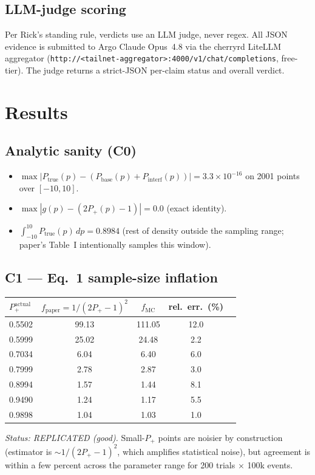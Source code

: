 \documentclass[11pt,letterpaper]{article}
\begin{document}
\subsection{LLM-judge scoring}
Per Rick's standing rule, verdicts use an LLM judge, never regex. All JSON evidence is
submitted to Argo Claude Opus~4.8 via the cherryrd LiteLLM aggregator
(\texttt{http://<tailnet-aggregator>:4000/v1/chat/completions}, free-tier). The judge returns a
strict-JSON per-claim status and overall verdict.

\section{Results}

\subsection{Analytic sanity (C0)}
\begin{itemize}
  \item $\max |P_\text{true}(p) - (P_\text{base}(p) + P_\text{interf}(p))| = 3.3 \times 10^{-16}$
    on 2001 points over $[-10, 10]$.
  \item $\max |g(p) - (2 P_+(p) - 1)| = 0.0$ (exact identity).
  \item $\int_{-10}^{10} P_\text{true}(p)\,dp = 0.8984$ (rest of density outside the sampling
    range; paper's Table~I intentionally samples this window).
\end{itemize}

\subsection{C1 --- Eq.~1 sample-size inflation}
\begin{center}
\begin{tabular}{lcccc}
\toprule
$P_+^\text{actual}$ & $f_\text{paper} = 1/(2P_+-1)^2$ & $f_\text{MC}$ & rel.\ err.\ (\%) \\
\midrule
0.5502 & 99.13 & 111.05 & 12.0 \\
0.5999 & 25.02 & 24.48  & 2.2  \\
0.7034 & 6.04  & 6.40   & 6.0  \\
0.7999 & 2.78  & 2.87   & 3.0  \\
0.8994 & 1.57  & 1.44   & 8.1  \\
0.9490 & 1.24  & 1.17   & 5.5  \\
0.9898 & 1.04  & 1.03   & 1.0  \\
\bottomrule
\end{tabular}
\end{center}
\emph{Status: REPLICATED (good).} Small-$P_+$ points are noisier by construction (estimator
is $\sim 1/(2P_+-1)^2$, which amplifies statistical noise), but agreement is within a few
percent across the parameter range for 200 trials $\times$ 100k events.
\end{document}
